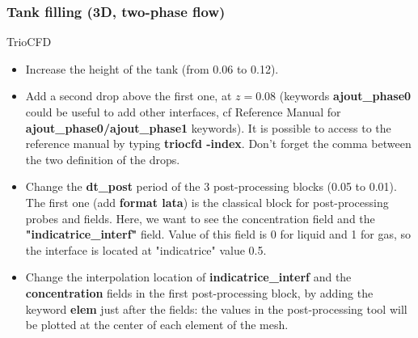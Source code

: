 \documentclass[10pt, hyperref={unicode=true,pdfusetitle, bookmarks=true,bookmarksnumbered=false,bookmarksopen=false, breaklinks=false,pdfborder={0 0l 1},backref=true,colorlinks=true,linkcolor=darkblue,pageanchor}]{beamer}
\begin{document}
\begin{frame}
\frametitle{Tank filling (3D, two-phase flow)}
\begin{block}{TrioCFD}

\begin{itemize}
\item Increase the height of the tank (from 0.06 to 0.12).

\item Add a second drop above the first one, at $z=0.08$ (keywords \textbf{ajout\_phase0} could be useful to add other interfaces, cf Reference Manual for \textbf{ajout\_phase0/ajout\_phase1} keywords). It is possible to access to the reference manual by typing \textbf{triocfd -index}. Don't forget the comma between the two definition of the drops.

\item Change the \textbf{dt\_post} period of the 3 post-processing blocks (0.05 to 0.01). The first one (add \textbf{format lata}) is the classical block for post-processing probes and fields. Here, we want to see the concentration field and the \textbf{"indicatrice\_interf"} field. Value of this field is 0 for liquid and 1 for gas, so the interface is located at "indicatrice" value 0.5.

\item Change the interpolation location of \textbf{indicatrice\_interf} and the \textbf{concentration} fields in the first post-processing block, by adding the keyword \textbf{elem} just after the fields: the values in the post-processing tool will be plotted at the center of each element of the mesh.
\end{itemize}

\end{block}
\end{frame}
\end{document}
